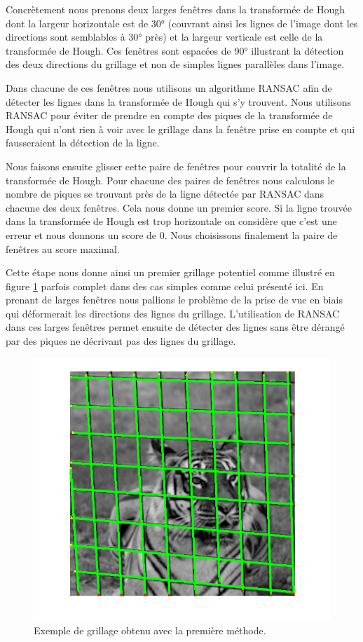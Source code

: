 Concrètement nous prenons deux larges fenêtres dans la transformée de Hough dont la largeur horizontale est de 30° (couvrant ainsi les lignes de l'image dont les directions sont semblables à 30° près) et la largeur verticale est celle de la transformée de Hough. Ces fenêtres sont espacées de 90° illustrant la détection des deux directions du grillage et non de simples lignes parallèles dans l'image. 

Dans chacune de ces fenêtres nous utilisons un algorithme RANSAC afin de détecter les lignes dans la transformée de Hough qui s'y trouvent. Nous utilisons RANSAC pour éviter de prendre en compte des piques de la transformée de Hough qui n'ont rien à voir avec le grillage dans la fenêtre prise en compte et qui fausseraient la détection de la ligne. 

Nous faisons ensuite glisser cette paire de fenêtres pour couvrir la totalité de la transformée de Hough. Pour chacune des paires de fenêtres nous calculons le nombre de piques se trouvant près de la ligne détectée par RANSAC dans chacune des deux fenêtres. Cela nous donne un premier score. Si la ligne trouvée dans la transformée de Hough est trop horizontale on considère que c'est une erreur et nous donnons un score de 0. Nous choisissons finalement la paire de fenêtres au score maximal. 


Cette étape nous donne ainsi un premier grillage potentiel comme illustré en figure \ref{grillage1} parfois complet dans des cas simples comme celui présenté ici. En prenant de larges fenêtres nous pallions le problème de la prise de vue en biais qui déformerait les directions des lignes du grillage. L'utilisation de RANSAC dans ces larges fenêtres permet ensuite de détecter des lignes sans être dérangé par des piques ne décrivant pas des lignes du grillage. 

\begin{figure}[h]
\begin{center}
\includegraphics[scale=0.4]{fig/grillage1.png}
\caption{\label{grillage1}Exemple de grillage obtenu avec la première méthode.}
\end{center}
\end{figure}

